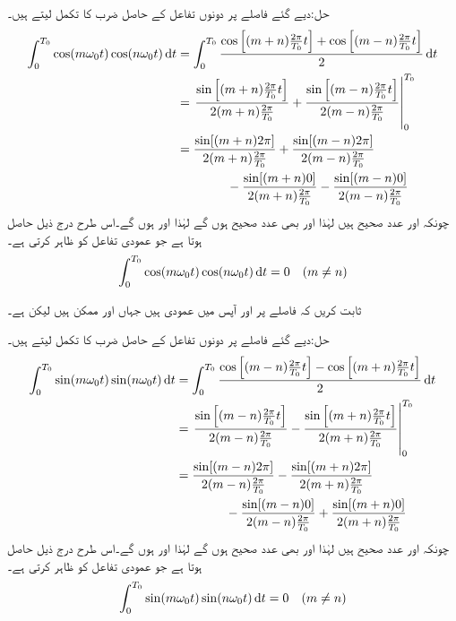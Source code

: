حل:دیے گئے فاصلے پر دونوں تفاعل کے حاصل ضرب کا تکمل لیتے ہیں۔
\begin{align*}
\int_0^{T_0} \cos (m\omega_0 t) \cos (n\omega_0 t) \dif t&=\int_0^{T_0} \frac{\cos\left[(m+n)\frac{2\pi}{T_0} t\right]+\cos\left[(m-n)\frac{2\pi}{T_0} t\right]}{2}\dif t\\
&=\left.\frac{\sin\left[(m+n)\frac{2\pi}{T_0} t\right]}{2(m+n)\frac{2\pi}{T_0} }+\frac{\sin\left[(m-n)\frac{2\pi}{T_0} t\right]}{2(m-n)\frac{2\pi}{T_0} }\right|_0^{T_0}\\
&=\frac{\sin[(m+n)2\pi]}{2(m+n)\frac{2\pi}{T_0} }+\frac{\sin[(m-n)2\pi]}{2(m-n)\frac{2\pi}{T_0} }\\
&\quad \quad \quad \quad -\frac{\sin[(m+n)0]}{2(m+n)\frac{2\pi}{T_0} }-\frac{\sin[(m-n)0]}{2(m-n)\frac{2\pi}{T_0} }
\end{align*}
چونکہ  اور  عدد صحیح ہیں لہٰذا  اور  بھی عدد صحیح ہوں گے لہٰذا  اور   ہوں گے۔اس طرح درج ذیل حاصل ہوتا ہے جو عمودی تفاعل کو ظاہر کرتی ہے۔
\begin{align}\label{مساوات_فوریئر_مختلف_تکمل_الف}
\int_0^{T_0} \cos (m\omega_0 t) \cos (n\omega_0 t) \dif t=0\quad (m\ne n)
\end{align}

ثابت کریں کہ  فاصلے پر  اور  آپس میں عمودی ہیں جہاں  اور  ممکن ہیں لیکن  ہے۔

حل:دیے گئے فاصلے پر دونوں تفاعل کے حاصل ضرب کا تکمل لیتے ہیں۔
\begin{align*}
\int_0^{T_0} \sin (m\omega_0 t) \sin (n\omega_0 t) \dif t&=\int_0^{T_0} \frac{\cos\left[(m-n)\frac{2\pi}{T_0} t\right]-\cos\left[(m+n)\frac{2\pi}{T_0} t\right]}{2}\dif t\\
&=\left.\frac{\sin\left[(m-n)\frac{2\pi}{T_0} t\right]}{2(m-n)\frac{2\pi}{T_0} }-\frac{\sin\left[(m+n)\frac{2\pi}{T_0} t\right]}{2(m+n)\frac{2\pi}{T_0} }\right|_0^{T_0}\\
&=\frac{\sin[(m-n)2\pi]}{2(m-n)\frac{2\pi}{T_0} }-\frac{\sin[(m+n)2\pi]}{2(m+n)\frac{2\pi}{T_0} }\\
&\quad \quad \quad \quad -\frac{\sin[(m-n)0]}{2(m-n)\frac{2\pi}{T_0} }+\frac{\sin[(m+n)0]}{2(m+n)\frac{2\pi}{T_0} }
\end{align*}
چونکہ  اور  عدد صحیح ہیں لہٰذا  اور  بھی عدد صحیح ہوں گے لہٰذا  اور   ہوں گے۔اس طرح درج ذیل حاصل ہوتا ہے جو عمودی تفاعل کو ظاہر کرتی ہے۔
\begin{align}\label{مساوات_فوریئر_مختلف_تکمل_ب}
\int_0^{T_0} \sin (m\omega_0 t) \sin (n\omega_0 t) \dif t=0\quad (m\ne n)
\end{align}


